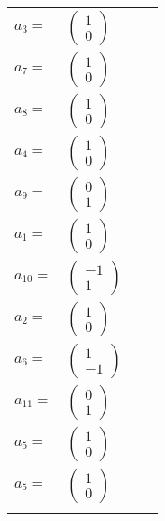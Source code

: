 \documentclass[1p]{elsarticle_modified}
\theoremstyle{definition}
\begin{document}
\begin{tabular}{m{7pt} m{180pt} m{7pt} m{180pt} }
\flushright $a_{3}=$&$\begin{pmatrix}1\\0\end{pmatrix}$ \\
\flushright $a_{7}=$&$\begin{pmatrix}1\\0\end{pmatrix}$ \\
\flushright $a_{8}=$&$\begin{pmatrix}1\\0\end{pmatrix}$ \\
\flushright $a_{4}=$&$\begin{pmatrix}1\\0\end{pmatrix}$ \\
\flushright $a_{9}=$&$\begin{pmatrix}0\\1\end{pmatrix}$ \\
\flushright $a_{1}=$&$\begin{pmatrix}1\\0\end{pmatrix}$ \\
\flushright $a_{10}=$&$\begin{pmatrix}-1\\1\end{pmatrix}$ \\
\flushright $a_{2}=$&$\begin{pmatrix}1\\0\end{pmatrix}$ \\
\flushright $a_{6}=$&$\begin{pmatrix}1\\-1\end{pmatrix}$ \\
\flushright $a_{11}=$&$\begin{pmatrix}0\\1\end{pmatrix}$ \\
\flushright $a_{5}=$&$\begin{pmatrix}1\\0\end{pmatrix}$\\ \flushright $a_{5}=$&$\begin{pmatrix}1\\0\end{pmatrix}$\\&\end{tabular}
\end{document}
